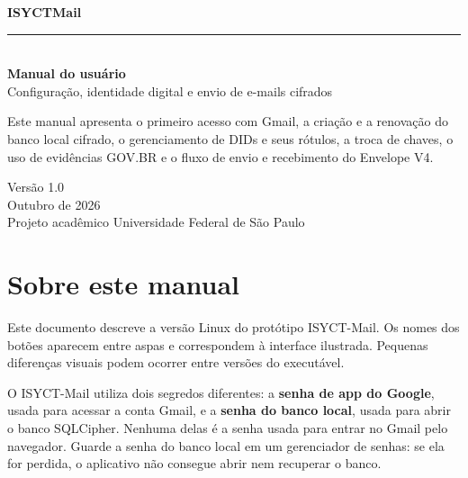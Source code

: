 \documentclass[11pt,a4paper]{article}
\begin{document}
\begin{titlepage}
  \pagecolor{isyctNavy}
  \color{white}
  \vspace*{18mm}
  {\Huge\bfseries ISYCT\textcolor{isyctCyan}{Mail}}\\[5mm]
  {\color{isyctCyan}\rule{34mm}{1.2mm}}\\[17mm]
  {\fontsize{31}{36}\selectfont\bfseries Manual do usuário}\\[8mm]
  {\Large Configuração, identidade digital e envio de e-mails cifrados}\\[20mm]

  \begin{tcolorbox}[
    colback=isyctPanel,colframe=isyctCyan!60!isyctPanel,
    boxrule=0.8pt,arc=3mm,left=7mm,right=7mm,top=6mm,bottom=6mm
  ]
    \color{white}
    Este manual apresenta o primeiro acesso com Gmail, a criação e a renovação do banco local cifrado, o gerenciamento de DIDs e seus rótulos, a troca de chaves, o uso de evidências GOV.BR e o fluxo de envio e recebimento do Envelope V4.
  \end{tcolorbox}

  \vfill
  {\large Versão 1.0}\\[2mm]
  {\normalsize Outubro de 2026}\\[9mm]
  {\small Projeto acadêmico \textbullet{} Universidade Federal de São Paulo}
\end{titlepage}
\nopagecolor
\color{isyctText}

\section*{Sobre este manual}

Este documento descreve a versão Linux do protótipo ISYCT-Mail. Os nomes dos botões aparecem entre aspas e correspondem à interface ilustrada. Pequenas diferenças visuais podem ocorrer entre versões do executável.

\begin{warningbox}
  O ISYCT-Mail utiliza dois segredos diferentes: a \textbf{senha de app do Google}, usada para acessar a conta Gmail, e a \textbf{senha do banco local}, usada para abrir o banco SQLCipher. Nenhuma delas é a senha usada para entrar no Gmail pelo navegador. Guarde a senha do banco local em um gerenciador de senhas: se ela for perdida, o aplicativo não consegue abrir nem recuperar o banco.
\end{warningbox}

\tableofcontents
\clearpage
\end{document}
